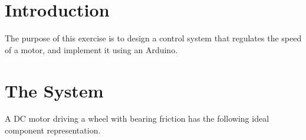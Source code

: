 





\begin{frame}
  \titlepage
\end{frame}



\section{Introduction}
The purpose of this exercise is to design a control system that regulates the speed of a motor, and implement it using an Arduino. 

\section{The System}

A DC motor driving a wheel with bearing friction has the following ideal component representation.


